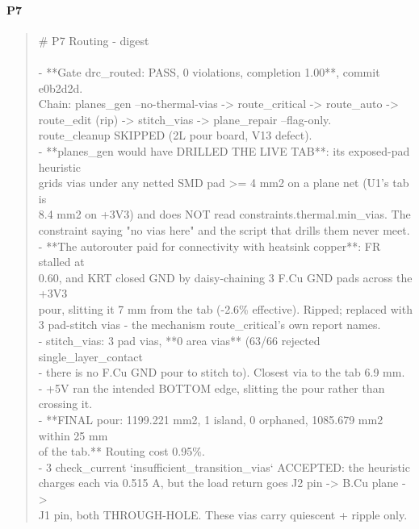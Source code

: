 \documentclass[11pt,a4paper]{article}
\begin{document}
\paragraph*{P7}
\begin{quote}\small\ttfamily\raggedright
\# P7 Routing - digest\\
~\\
- {*}{*}Gate drc\_routed: PASS, 0 violations, completion 1.00{*}{*}, commit e0b2d2d.\\
  Chain: planes\_gen --no-thermal-vias -\textgreater{} route\_critical -\textgreater{} route\_auto -\textgreater{}\\
  route\_edit (rip) -\textgreater{} stitch\_vias -\textgreater{} plane\_repair --flag-only.\\
  route\_cleanup SKIPPED (2L pour board, V13 defect).\\
- {*}{*}planes\_gen would have DRILLED THE LIVE TAB{*}{*}: its exposed-pad heuristic\\
  grids vias under any netted SMD pad \textgreater{}= 4 mm2 on a plane net (U1's tab is\\
  8.4 mm2 on +3V3) and does NOT read constraints.thermal.min\_vias. The\\
  constraint saying "no vias here" and the script that drills them never meet.\\
- {*}{*}The autorouter paid for connectivity with heatsink copper{*}{*}: FR stalled at\\
  0.60, and KRT closed GND by daisy-chaining 3 F.Cu GND pads across the +3V3\\
  pour, slitting it 7 mm from the tab (-2.6\% effective). Ripped; replaced with\\
  3 pad-stitch vias - the mechanism route\_critical's own report names.\\
- stitch\_vias: 3 pad vias, {*}{*}0 area vias{*}{*} (63/66 rejected single\_layer\_contact\\
  - there is no F.Cu GND pour to stitch to). Closest via to the tab 6.9 mm.\\
- +5V ran the intended BOTTOM edge, slitting the pour rather than crossing it.\\
- {*}{*}FINAL pour: 1199.221 mm2, 1 island, 0 orphaned, 1085.679 mm2 within 25 mm\\
  of the tab.{*}{*} Routing cost 0.95\%.\\
- 3 check\_current `insufficient\_transition\_vias` ACCEPTED: the heuristic\\
  charges each via 0.515 A, but the load return goes J2 pin -\textgreater{} B.Cu plane -\textgreater{}\\
  J1 pin, both THROUGH-HOLE. These vias carry quiescent + ripple only.
\end{quote}
\end{document}
